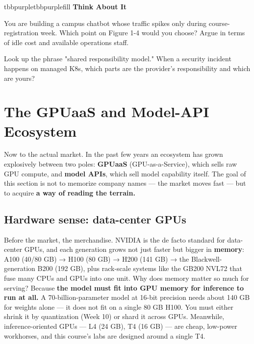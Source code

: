 \begin{calloutbox}{tbbpurple}{tbbpurplefill}
{\normalsize\bfseries\color{tbbpurple}Think About It}\par\vspace{3pt}
\begin{tbbitemize}
  \item You are building a campus chatbot whose traffic spikes only during course-registration week. Which point on Figure 1-4 would you choose? Argue in terms of idle cost and available operations staff.
  \item Look up the phrase "shared responsibility model." When a security incident happens on managed K8s, which parts are the provider's responsibility and which are yours?
\end{tbbitemize}
\end{calloutbox}

\section{The GPUaaS and Model-API Ecosystem}

Now to the actual market. In the past few years an ecosystem has grown explosively between two poles: \textbf{GPUaaS} (GPU-as-a-Service), which sells raw GPU compute, and \textbf{model APIs}, which sell model capability itself. The goal of this section is not to memorize company names — the market moves fast — but to acquire \textbf{a way of reading the terrain.}

\subsection*{Hardware sense: data-center GPUs}

Before the market, the merchandise. NVIDIA is the de facto standard for data-center GPUs, and each generation grows not just faster but bigger in \textbf{memory}: A100 (40/80 GB) → H100 (80 GB) → H200 (141 GB) → the Blackwell-generation B200 (192 GB), plus rack-scale systems like the GB200 NVL72 that fuse many CPUs and GPUs into one unit. Why does memory matter so much for serving? Because \textbf{the model must fit into GPU memory for inference to run at all.} A 70-billion-parameter model at 16-bit precision needs about 140 GB for weights alone — it does not fit on a single 80 GB H100. You must either shrink it by quantization (Week 10) or shard it across GPUs. Meanwhile, inference-oriented GPUs — L4 (24 GB), T4 (16 GB) — are cheap, low-power workhorses, and this course's labs are designed around a single T4.


